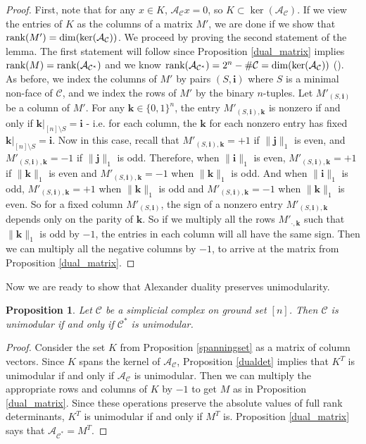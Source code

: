 \documentclass[letterpaper,12pt]{amsart}
\theoremstyle{plain}
\newtheorem{prop}[thm]{Proposition}
\theoremstyle{definition}
\theoremstyle{remark}
\newcommand{\bfi}{\mathbf{i}}
\newcommand{\bfj}{\mathbf{j}}
\newcommand{\bfk}{\mathbf{k}}
\newcommand{\rank}{\textnormal{rank}}
\begin{document}
\begin{proof}
	First, note that for any $x \in K$, $\mathcal{A}_\mathcal{C} x=0$, so $K\subset \ker(\mathcal{A}_\mathcal{C})$.
	If we view the entries of $K$ as the columns of a matrix $M'$, we are done if we show that $\rank(M') = \dim(\ker(\mathcal{A}_\mathcal{C}))$.
	We proceed by proving the second statement of the lemma.
	The first statement will follow since Proposition \ref{dual_matrix} implies $\rank(M)=\rank(\mathcal{A}_{\mathcal{C}^*})$ and we know
	$\rank(\mathcal{A}_{\mathcal{C}^*})= 2^n-\#\mathcal{C}=\dim(\ker(\mathcal{A}_\mathcal{C}))$ (\cite[Thm 2.6]{Hosten2002}).
	\\
	\indent
	As before, we index the columns of $M'$ by pairs $(S,\bfi)$ where $S$ is a minimal non-face of $\mathcal{C}$,
	and we index the rows of $M'$ by the binary $n$-tuples.
	Let $M'_{(S,\bfi)}$ be a column of $M'$.
	For any $\bfk \in \{0,1\}^n$, the entry $M'_{(S,\bfi),\bfk}$ is nonzero if and only if $\bfk|_{[n]\setminus S} = \bfi$ - i.e. for each column, the $\bfk$ for
	each nonzero entry has fixed $\bfk|_{[n]\setminus S} = \bfi$.
	Now in this case, recall that $M'_{(S,\bfi),\bfk} = +1$ if $\|\bfj\|_1$ is even, and $M'_{(S,\bfi),\bfk} = -1$ if $\|\bfj\|_1$ is odd.
	Therefore, when $\|\bfi\|_1$ is even, $M'_{(S,\bfi),\bfk} = +1$ if $\|\bfk\|_1$ is even and $M'_{(S,\bfi),\bfk} = -1$ when $\|\bfk\|_1$ is odd.
	And when $\|\bfi\|_1$ is odd, $M'_{(S,\bfi),\bfk} = +1$ when $\|\bfk\|_1$ is odd and $M'_{(S,\bfi),\bfk} = -1$ when $\|\bfk\|_1$ is even.
	So for a fixed column $M'_{(S,\bfi)}$, the sign of a nonzero entry $M'_{(S,\bfi),\bfk}$ depends only on the parity of $\bfk$.
	So if we multiply all the rows $M'_{\cdot,\bfk}$ such that $\|\bfk\|_1$ is odd by $-1$, the entries in each column will all have the same sign.
	Then we can multiply all the negative columns by $-1$, to arrive at the matrix
	from Proposition \ref{dual_matrix}.
\end{proof}

Now we are ready to show that Alexander duality preserves unimodularity.

\begin{prop}\label{dual_uni}
	Let $\mathcal{C}$ be a simplicial complex on ground set $[n]$.
	Then $\mathcal{C}$ is unimodular if and only if $\mathcal{C}^*$ is unimodular.
\end{prop}
\begin{proof}
	Consider the set $K$ from Proposition \ref{spanningset} as a matrix of column vectors.
	Since $K$ spans the kernel of $\mathcal{A}_\mathcal{C}$, Proposition \ref{dualdet} implies that $K^T$ is unimodular if and only if $\mathcal{A}_\mathcal{C}$ is unimodular.
	Then we can multiply the appropriate rows and columns of $K$ by $-1$ to get $M$ as in Proposition \ref{dual_matrix}.
	Since these operations preserve the absolute values of full rank determinants, $K^T$ is unimodular if and only if $M^T$ is.
	Proposition \ref{dual_matrix} says that $\mathcal{A}_{\mathcal{C}^*} = M^T$.
\end{proof}
\end{document}
